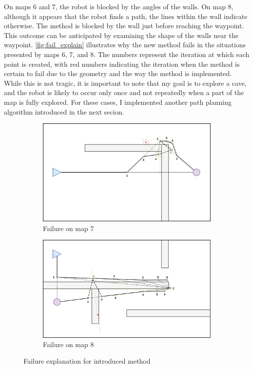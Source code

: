 \documentclass[../main.tex]{subfiles}
\begin{document}
On maps 6 and 7, the robot is blocked by the angles of the walls. On map 8, although it appears that the robot finds a path, the lines within the wall indicate otherwise. The method is blocked by the wall just before reaching the waypoint. This outcome can be anticipated by examining the shape of the walls near the waypoint. \autoref{fig:fail_explain} illustrates why the new method fails in the situations presented by maps 6, 7, and 8. The numbers represent the iteration at which each point is created, with red numbers indicating the iteration when the method is certain to fail due to the geometry and the way the method is implemented. While this is not tragic, it is important to note that my goal is to explore a cave, and the robot is likely to occur only once and not repeatedly when a part of the map is fully explored. For these cases, I implemented another path planning algorithm introduced in the next secion. 

\begin{figure}[H]
	\centering
	\begin{subfigure}[b]{0.45\textwidth}
		\centering
		\includegraphics[width=\textwidth]{IMAGES/part3/explain_map7.png}
		\caption{Failure on map 7}
		\label{fig:failure_map7}
	\end{subfigure}
	\hfill
	\begin{subfigure}[b]{0.45\textwidth}
		\centering
		\includegraphics[width=\textwidth]{IMAGES/part3/explain_map8.png}
		\caption{Failure on map 8}
		\label{fig:failure_map8}
	\end{subfigure}
	\caption{Failure explanation for introduced method}
	\label{fig:fail_explain}
\end{figure}
\end{document}
